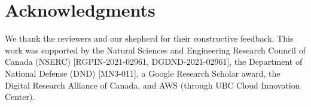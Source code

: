 \vspace{-0.2cm}
\section{Acknowledgments}
We thank the reviewers and our shepherd for their constructive
feedback.
This work was supported by the Natural Sciences and Engineering Research
Council of Canada (NSERC) [RGPIN-2021-02961,
DGDND-2021-02961], the Department of National Defense (DND) [MN3-011], a
Google Research Scholar award, the Digital Research Alliance of Canada, and AWS
(through UBC Cloud Innovation Center).

